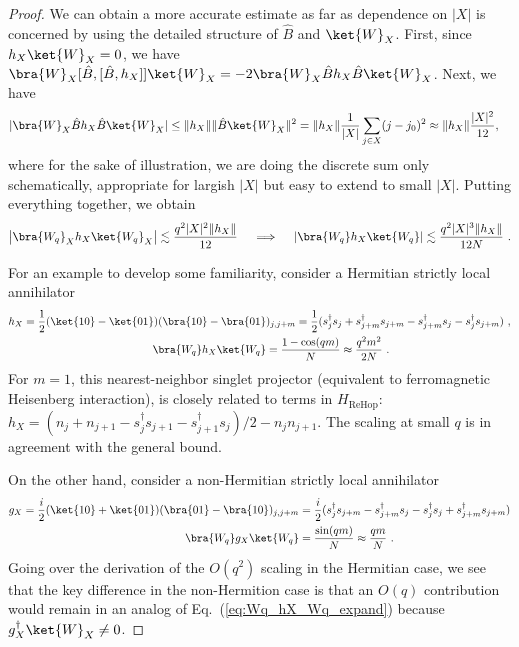 \documentclass[prx,letterpaper,aps,superscriptaddress,floatfix,twocolumn,nofootinbib]{revtex4-2}
\theoremstyle{definition}
\newcommand{\ktW}{\ket{W}}
\begin{document}
\begin{proof}
%
We can obtain a more accurate estimate as far as dependence on $|X|$ is concerned by using the detailed structure of $\hat{B}$ and $\ktW_X$.
%
First, since $h_X \ktW_X = 0$, we have
$\bra{W}_X [\hat{B}, [\hat{B}, h_X]] \ktW_X = -2 \bra{W}_X \hat{B} h_X \hat{B} \ktW_X$.
%
Next, we have
\begin{equation}
\begin{aligned}
& |\bra{W}_X \hat{B} h_X \hat{B} \ktW_X | \leq \| h_X \| \| \hat{B} \ktW_X \|^2 = \| h_X \| \frac{1}{|X|} \sum_{j \in X} (j-j_0)^2 \approx \| h_X \| \frac{|X|^2}{12},
\end{aligned}
\end{equation}
where for the sake of illustration, we are doing the discrete sum only schematically, appropriate for largish $|X|$ but easy to extend to small $|X|$.
%
Putting everything together, we obtain
\begin{equation}
\left| \bra{W_q}_X h_X \ket{W_q}_X \right| \lesssim \frac{q^2 |X|^2 \|h_X\|}{12}
\quad \implies \quad \left| \bra{W_q} h_X \ket{W_q} \right| \lesssim \frac{q^2 |X|^3 \|h_X\|}{12 N} ~.
\label{eq:bound_Wq_hX_Wq}
\end{equation}

For an example to develop some familiarity, consider a Hermitian strictly local annihilator
\begin{align}
h_X = \frac{1}{2} (\ket{10} - \ket{01})(\bra{10} - \bra{01}&)_{j,j+m}=\frac{1}{2}(s_j^\dag s_j+s_{j+m}^\dag s_{j+m}-s_{j+m}^\dag s_j-s_j^\dag s_{j+m}) ~, \nonumber\\
\bra{W_q} h_X \ket{W_q} &= \frac{1 - \cos(qm)}{N} \approx \frac{q^2 m^2}{2N} ~.
\end{align}
For $m = 1$, this nearest-neighbor singlet projector (equivalent to ferromagnetic Heisenberg interaction), is closely related to terms in $H_{\text{ReHop}}$:
$h_X = (n_j + n_{j+1} - s_j^\dagger s_{j+1} - s_{j+1}^\dagger s_j )/2 - n_j n_{j+1}.$
%
The scaling at small $q$ is in agreement with the general bound.

On the other hand, consider a non-Hermitian strictly local annihilator
\begin{align}
g_X = \frac{i}{2} ( \ket{10} + \ket{01})(  \bra{01}-  \bra{10})_{j,j+m}&=\frac{i}{2}(s_j^\dag s_{j+m}-s_{j+m}^\dag s_j-s_j^\dag s_j +s^\dag_{j+m} s_{j+m})\nonumber\\
\bra{W_q} g_X \ket{W_q} &= \frac{\sin(qm)}{N} \approx \frac{qm}{N} ~. 
\end{align}
Going over the derivation of the $O(q^2)$ scaling in the Hermitian case, we see that the key difference in the non-Hermition case is that an $O(q)$ contribution would remain in an analog of Eq.~(\ref{eq:Wq_hX_Wq_expand}) because $g_X^\dagger \ket{W}_X \neq 0$.
%


\end{proof}
\end{document}
